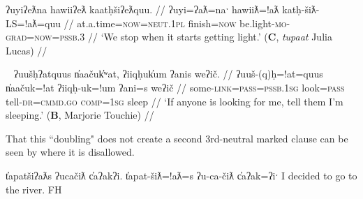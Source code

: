 \ex \label{ex:doubleatl}
\begingl
\glpreamble ʔuyiʔeƛna hawiiʔeƛ kaatḥšiʔeƛquu. //
\gla ʔuyi=ʔaƛ=naˑ hawiiƛ=!aƛ katḥ-šiƛ-LS=!aƛ=quu  //
\glb at.a.time=\textsc{now}=\textsc{neut.1pl} finish=\textsc{now} be.light-\textsc{mo}-\textsc{grad}=\textsc{now}=\textsc{pssb.3} //
\glft `We stop when it starts getting light.' (\textbf{C}, \textit{tupaat} Julia Lucas) //
\endgl
\xe



\begin{comment}
\ex~ \label{ex:doubleap}
\begingl
\glpreamble hišuk̓ap̓aƛ witkʷaaʔap ʔin wikmaḥsap̓aƛ, ḥaakʷaaƛsma. //
\gla hišuk=!ap=!aƛ witkʷaa=!ap ʔin wik-maḥsa=!ap=!aƛ, ḥaakʷaaƛ-sma  //
\glb all=\textsc{caus}=\textsc{now} destroy=\textsc{caus} \textsc{comp} \textsc{neg}-want.to=\textsc{caus}=\textsc{caus} young.woman-protective.of //
\glft `Everyone destroyed the wharf because they wanted her to marry, they were stingy of the girl.' (\textbf{C}, \textit{tupaat} Julia Lucas) //
\endgl
\xe
\end{comment}


\ex~ \label{ex:doubleatpass}
\begingl
\glpreamble ʔuušḥʔatquus n̓aačuk̓ʷat, ʔiiqḥuk̓um ʔanis weʔič. //
\gla ʔuuš-(q)ḥ=!at=quus n̓aačuk=!at ʔiiqḥ-uk=!um ʔani=s weʔič  //
\glb some-\textsc{link}=\textsc{pass}=\textsc{pssb.1sg} look=\textsc{pass} tell-\textsc{dr}=\textsc{cmmd.go} \textsc{comp}=\textsc{1sg} sleep //
\glft `If anyone is looking for me, tell them I'm sleeping.' (\textbf{B}, Marjorie Touchie) //
\endgl
\xe

\begin{comment}
\ex~ \label{ex:doubleatgeneric}
\begingl
\glpreamble ʔayaqḥʔatna huḥtak̓at. //
\gla ʔaya-(q)ḥ=!at=naˑ huḥtak=!at  //
\glb many-\textsc{link}=\textsc{pass}=\textsc{neut.1pl} learn=\textsc{pass} //
\glft `Many know.' (\textbf{B}, Marjorie Touchie) //
\endgl
\xe
\end{comment}




That this ``doubling" does not create a second 3rd-neutral marked clause can be seen by where it is disallowed.

t̓apatšiʔaƛs ʔucačiƛ c̓aʔakʔi.
t̓apat-šiƛ=!aƛ=s ʔu-ca-čiƛ c̓aʔak=ʔiˑ
I decided to go to the river. FH

